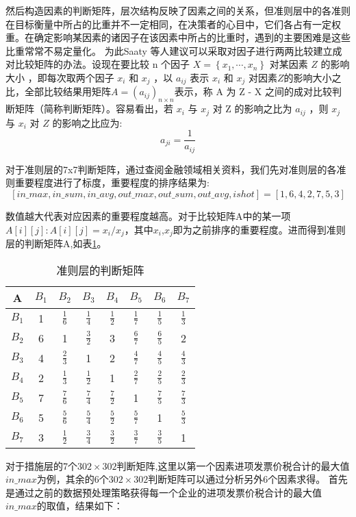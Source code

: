 \documentclass{cumcmthesis}
\begin{document}
然后构造因素的判断矩阵，层次结构反映了因素之间的关系，但准则层中的各准则在目标衡量中所占的比重并不一定相同，在决策者的心目中，它们各占有一定权重。在确定影响某因素的诸因子在该因素中所占的比重时，遇到的主要困难是这些比重常常不易定量化。 为此Saaty 等人建议可以采取对因子进行两两比较建立成对比较矩阵的办法。设现在要比较 n 个因子 $X = \left\{ x_1,\cdots, x_n \right\} $ 对某因素 $Z$ 的影响大小 ，即每次取两个因子 $x_i$ 和 $x_j$ ，以 $a_{ij}$ 表示 $x_i$ 和 $x_j$ 对因素$Z$的影响大小之比，全部比较结果用矩阵$A = (a_{ij} )_{n \times n} $表示，称 A 为 Z - X 之间的成对比较判断矩阵（简称判断矩阵）。容易看出，若 $x_i$ 与 $x_j$ 对 Z 的影响之比为 $a_{ij}$ ，则 $x_j$ 与 $x_i$ 对 $Z$ 的影响之比应为:
\begin{equation}
    a_{ji} = \frac{1}{a_{ij}}
\end{equation}

对于准则层的7x7判断矩阵，通过查阅金融领域相关资料，我们先对准则层的各准则重要程度进行了标度，重要程度的排序结果为:$$\left[ in\_max,in\_sum,in\_avg,out\_max,out\_sum,out\_avg,ishot\right]=[1,6,4,2,7,5,3]$$

数值越大代表对应因素的重要程度越高。对于比较矩阵A中的某一项$A\left[i\right]\left[j\right]:A\left[i\right]\left[j\right]=x_i/x_j$，其中$x_i$,$x_j$即为之前排序的重要程度。进而得到准则层的判断矩阵A,如表\ref{tablejudge}。

\begin{table}[H]
    \centering
    \begin{tabular}{|c|ccccccc|}%
    \hline
        A & $B_1$ & $B_2$ & $B_3$ & $B_4$ & $B_5$ & $B_6$ & $B_7$   \\
    \hline 
    $B_1$  &  1   &$\frac{1}{6}$  &$\frac{1}{4}$  &$\frac{1}{2}$  &$\frac{1}{7}$  &$\frac{1}{5}$  &$\frac{1}{3}$\\
    $B_2$  &  6   &1              &$\frac{3}{2}$  &3              &$\frac{6}{7}$  &$\frac{6}{5}$  &2\\
    $B_3$  &  4   &$\frac{2}{3}$  &1              &2              &$\frac{4}{7}$  &$\frac{4}{5}$  &$\frac{4}{3}$\\
    $B_4$  &  2   &$\frac{1}{3}$  &$\frac{1}{2}$  &1              &$\frac{2}{7}$  &$\frac{2}{5}$  &$\frac{2}{3}$\\
    $B_5$  &  7   &$\frac{7}{6}$  &$\frac{7}{4}$  &$\frac{7}{2}$  &1              &$\frac{7}{5}$  &$\frac{7}{3}$\\
    $B_6$  &  5   &$\frac{5}{6}$  &$\frac{5}{4}$  &$\frac{5}{2}$  &$\frac{5}{7}$  &1              &$\frac{5}{3}$\\
    $B_7$  &  3   &$\frac{1}{2}$  &$\frac{3}{4}$  &$\frac{3}{2}$  &$\frac{3}{7}$  &$\frac{3}{5}$  &1\\
    \hline
\end{tabular}
    \caption{准则层的判断矩阵}
    \label{tablejudge}
\end{table}
对于措施层的7个$302 \times 302$判断矩阵,这里以第一个因素进项发票价税合计的最大值$in\_max$为例，其余的6个$302\times 302$判断矩阵可以通过分析另外6个因素求得。
首先是通过之前的数据预处理策略获得每一个企业的进项发票价税合计的最大值$in\_max$的取值，结果如下：
\end{document}
